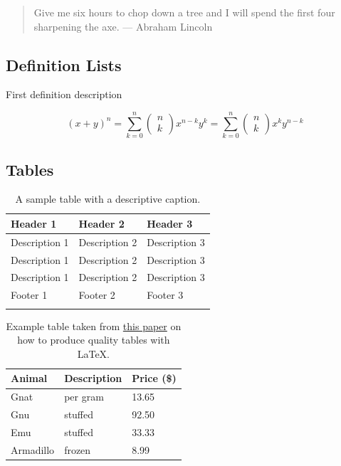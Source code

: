 \documentclass[
  11pt,
  a4paper,
]{article}
\providecommand{\tightlist}{%
  \setlength{\itemsep}{0pt}\setlength{\parskip}{0pt}}
\begin{document}
\begin{quote}
Give me six hours to chop down a tree and I will spend the first four
sharpening the axe. --- Abraham Lincoln
\end{quote}

\subsection{Definition Lists}\label{definition-lists}

\begin{description}
\tightlist
\item[Definition Title One] First definition description
\item[Binomial theorem]

\[(x+y)^{n}=\sum_{k=0}^{n}\left(\begin{array}{l}n \\
k\end{array}\right) x^{n-k}
y^{k}=\sum_{k=0}^{n}\left(\begin{array}{l}n \\ k\end{array}\right)
x^{k} y^{n-k}\]
          
\end{description}

\subsection{Tables}\label{tables}


\begin{longtable}[]{@{}lll@{}}
\caption{A sample table with a descriptive caption.}\tabularnewline
\toprule\noalign{}
Header 1 & Header 2 & Header 3 \\
\midrule\noalign{}
\endhead
Description 1 & Description 2 & Description 3 \\
Description 1 & Description 2 & Description 3 \\
Description 1 & Description 2 & Description 3 \\
\midrule\noalign{}
Footer 1 & Footer 2 & Footer 3 \\
\bottomrule\noalign{}
\end{longtable}

\begin{longtable}[]{@{}lll@{}}
\caption{Example table taken from
\href{https://texdoc.org/serve/booktabs/0}{this paper} on how to produce
quality tables with LaTeX.}\tabularnewline
\toprule\noalign{}
Animal & Description & Price (\$) \\
\midrule\noalign{}
\endhead
\bottomrule\noalign{}
\endlastfoot
Gnat & per gram & 13.65 \\
Gnu & stuffed & 92.50 \\
Emu & stuffed & 33.33 \\
Armadillo & frozen & 8.99 \\
\end{longtable}
\end{document}
